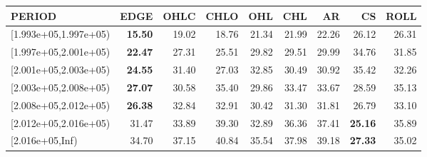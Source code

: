 \begin{table}[ht]
\centering
\begin{tabular}{lrrrrrrrr}
  \hline
PERIOD & EDGE & OHLC & CHLO & OHL & CHL & AR & CS & ROLL \\ 
  \hline
[1.993e+05,1.997e+05) & \textbf{15.50} & 19.02 & 18.76 & 21.34 & 21.99 & 22.26 & 26.12 & 26.31 \\ 
  [1.997e+05,2.001e+05) & \textbf{22.47} & 27.31 & 25.51 & 29.82 & 29.51 & 29.99 & 34.76 & 31.85 \\ 
  [2.001e+05,2.003e+05) & \textbf{24.55} & 31.40 & 27.03 & 32.85 & 30.49 & 30.92 & 35.42 & 32.26 \\ 
  [2.003e+05,2.008e+05) & \textbf{27.07} & 30.58 & 35.40 & 29.86 & 33.47 & 33.67 & 28.59 & 35.13 \\ 
  [2.008e+05,2.012e+05) & \textbf{26.38} & 32.84 & 32.91 & 30.42 & 31.30 & 31.81 & 26.79 & 33.10 \\ 
  [2.012e+05,2.016e+05) & 31.47 & 33.89 & 39.30 & 32.89 & 36.36 & 37.41 & \textbf{25.16} & 35.89 \\ 
  [2.016e+05,Inf) & 34.70 & 37.15 & 40.84 & 35.54 & 37.98 & 39.18 & \textbf{27.33} & 35.02 \\ 
   \hline
\end{tabular}
\end{table}
